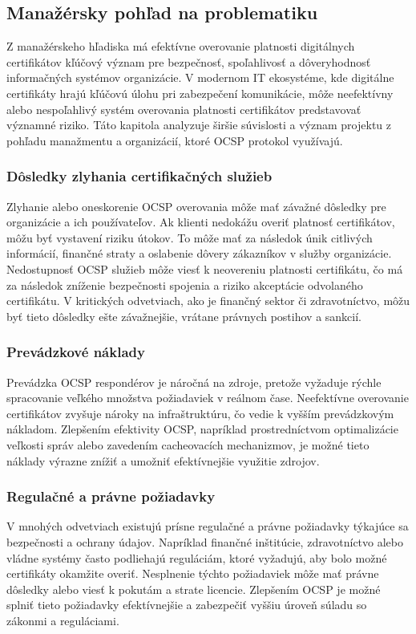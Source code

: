 \documentclass[12pt, twoside]{book}
\begin{document}
\subsection{Manažérsky pohľad na problematiku}
Z manažérskeho hľadiska má efektívne overovanie platnosti digitálnych certifikátov kľúčový význam pre bezpečnosť, spoľahlivosť a dôveryhodnosť informačných systémov organizácie. V modernom IT ekosystéme, kde digitálne certifikáty hrajú kľúčovú úlohu pri zabezpečení komunikácie, môže neefektívny alebo nespoľahlivý systém overovania platnosti certifikátov predstavovať významné riziko. Táto kapitola analyzuje širšie súvislosti a význam projektu z pohľadu manažmentu a organizácií, ktoré OCSP protokol využívajú.

\subsubsection{Dôsledky zlyhania certifikačných služieb}
Zlyhanie alebo oneskorenie OCSP overovania môže mať závažné dôsledky pre organizácie a ich používateľov. Ak klienti nedokážu overiť platnosť certifikátov, môžu byť vystavení riziku útokov. To môže mať za následok únik citlivých informácií, finančné straty a oslabenie dôvery zákazníkov v služby organizácie. Nedostupnosť OCSP služieb môže viesť k neovereniu platnosti certifikátu, čo má za následok zníženie bezpečnosti spojenia a riziko akceptácie odvolaného certifikátu. V kritických odvetviach, ako je finančný sektor či zdravotníctvo, môžu byť tieto dôsledky ešte závažnejšie, vrátane právnych postihov a sankcií.\cite{turin2}

\subsubsection{Prevádzkové náklady}
Prevádzka OCSP respondérov je náročná na zdroje, pretože vyžaduje rýchle spracovanie veľkého množstva požiadaviek v reálnom čase. Neefektívne overovanie certifikátov zvyšuje nároky na infraštruktúru, čo vedie k vyšším prevádzkovým nákladom. Zlepšením efektivity OCSP, napríklad prostredníctvom optimalizácie veľkosti správ alebo zavedením cacheovacích mechanizmov, je možné tieto náklady výrazne znížiť a umožniť efektívnejšie využitie zdrojov.

\subsubsection{Regulačné a právne požiadavky}
V mnohých odvetviach existujú prísne regulačné a právne požiadavky týkajúce sa bezpečnosti a ochrany údajov. Napríklad finančné inštitúcie, zdravotníctvo alebo vládne systémy často podliehajú reguláciám, ktoré vyžadujú, aby bolo možné certifikáty okamžite overiť. Nesplnenie týchto požiadaviek môže mať právne dôsledky alebo viesť k pokutám a strate licencie. Zlepšením OCSP je možné splniť tieto požiadavky efektívnejšie a zabezpečiť vyššiu úroveň súladu so zákonmi a reguláciami.
\end{document}
